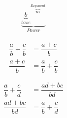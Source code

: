 \documentclass[20150903-160354-rs2.2-MarksMathNotebook.tex]{subfiles}
\begin{document}
\begin{definition}
\begin{align}
\underbrace{{\underbrace{b}_{base}}^{\overbrace{m}^{Exponent}}}_{Power} \label{eq:ooe}
\end{align}
\end{definition}

\begin{definition}
\begin{subequations}
\begin{align}
\dfrac{a}{b} + \dfrac{c}{b} &= \dfrac{a+c}{b} \label{eq:cd1} \\
\dfrac{a+c}{b}&= \dfrac{a}{b} + \dfrac{c}{b} \label{eq:cd2}
\end{align}
\end{subequations}
\end{definition}

\begin{arule}
\begin{subequations}
\begin{align}
\dfrac{a}{b} + \dfrac{c}{d} &= \dfrac{ad+bc}{bd} \label{eq:fooa1} \\
\dfrac{ad+bc}{bd} &= \dfrac{a}{b} + \dfrac{c}{d} \label{eq:fooa2}
\end{align}
\end{subequations}
\end{arule}
\end{document}
